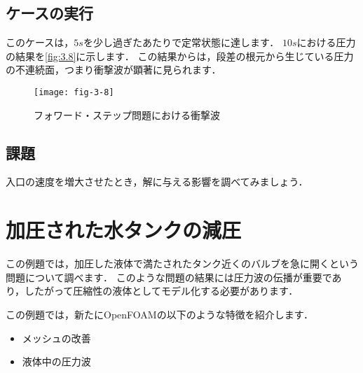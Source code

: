 \subsection{ケースの実行}
\label{ssec:3.3.3}
このケースは，$5 \unit{s}$を少し過ぎたあたりで定常状態に達します．
$10 \unit{s}$における圧力の結果を\autoref{fig:3.8}に示します．
この結果からは，段差の根元から生じている圧力の不連続面，つまり衝撃波が顕著に見られます．


\begin{figure}[ht]
 \texttt{[image: fig-3-8]}
 \caption{フォワード・ステップ問題における衝撃波}
 \label{fig:3.8}
\end{figure}


\subsection{課題}
\label{ssec:3.3.4}
入口の速度を増大させたとき，解に与える影響を調べてみましょう．



\section{加圧された水タンクの減圧}
\label{sec:3.4}
この例題では，加圧した液体で満たされたタンク近くのバルブを急に開くという問題について調べます．
このような問題の結果には圧力波の伝播が重要であり，したがって圧縮性の液体としてモデル化する必要があります．

この例題では，新たにOpenFOAMの以下のような特徴を紹介します．
\begin{itemize}
 \item メッシュの改善
 \item 液体中の圧力波
\end{itemize}


